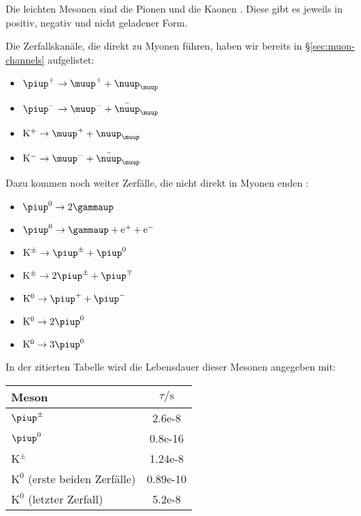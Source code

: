 \documentclass[11pt, ngerman, fleqn, DIV=15, headinclude, BCOR=2cm]{scrreprt}
\begin{document}
Die leichten Mesonen sind die Pionen und die Kaonen
\parencite[Tabelle~19.6]{meschede-gerthsen_24}. Diese gibt es jeweils in
positiv, negativ und nicht geladener Form.

Die Zerfallskanäle, die direkt zu Myonen führen, haben wir bereits in
§\ref{sec:muon-channels} aufgelistet:

\begin{itemize}
    \item
        $\piup^+ \to \muup^+ + \nuup_\muup$
    \item
        $\piup^- \to \muup^- + \bar \nuup_\muup$
    \item
        $\mathrm K^+ \to \muup^+ + \nuup_\muup$
    \item
        $\mathrm K^- \to \muup^- + \bar \nuup_\muup$
\end{itemize}

Dazu kommen noch weiter Zerfälle, die nicht direkt in Myonen enden \parencite[Tabelle~19.6]{meschede-gerthsen_24}:

\begin{itemize}
    \item
        $\piup^0 \to 2 \gammaup$
    \item
        $\piup^0 \to \gammaup + \eup^+ + \eup^-$
    \item
        $\mathrm K^\pm \to \piup^\pm + \piup^0$
    \item
        $\mathrm K^\pm \to 2 \piup^\pm + \piup^\mp$
    \item
        $\mathrm K^0 \to \piup^+ + \piup^-$
    \item
        $\mathrm K^0 \to 2 \piup^0$
    \item
        $\mathrm K^0 \to 3 \piup^0$
\end{itemize}

In der zitierten Tabelle wird die Lebensdauer dieser Mesonen angegeben mit:

\begin{tabular}{lS}
    Meson & {$\tau/\si\second$} \\
    \midrule
    $\piup^\pm$ & 2.6e-8 \\
    $\piup^0$ & 0.8e-16 \\
    $\mathrm K^\pm$ & 1.24e-8 \\
    $\mathrm K^0$ (erste beiden Zerfälle) & 0.89e-10 \\
    $\mathrm K^0$ (letzter Zerfall) & 5.2e-8 \\
\end{tabular}
\end{document}
